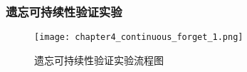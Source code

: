 



\subsubsection{遗忘可持续性验证实验}
\begin{figure}
    \centering
    \texttt{[image: chapter4\_continuous\_forget\_1.png]}
    \caption{遗忘可持续性验证实验流程图}
    \label{fig:chapter4_continuous_forget_1}
\end{figure}


